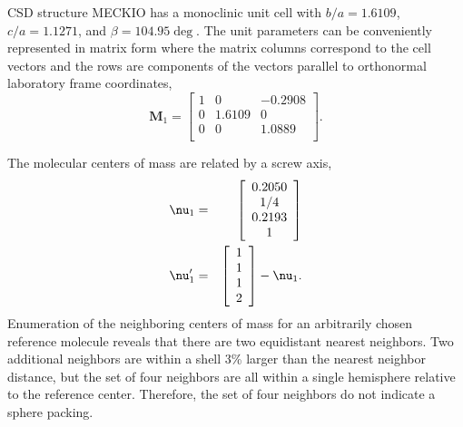 \documentclass[preprint]{iucr}              %
\begin{document}
CSD structure MECKIO has a monoclinic unit cell with $b/a=1.6109$, $c/a=1.1271$, and $\beta=104.95\deg$.  The unit parameters can be conveniently represented in matrix form where the matrix columns correspond to the cell vectors and the rows are components of the vectors parallel to orthonormal laboratory frame coordinates,
\begin{equation}
   \mathbf{M}_1=\left[
     \begin{array}{ccc}
        1& 0& -0.2908\\
        0& 1.6109& 0\\
        0& 0& 1.0889\\
     \end{array}
  \right].
\end{equation}

The molecular centers of mass are related by a screw axis,
\begin{eqnarray}
   \mbox{\boldmath$\nu$}_{1}&=&\left[
     \begin{array}{c}
        0.2050\\
        1/4\\
        0.2193\\
	1\\
     \end{array}
  \right]\\
   \mbox{\boldmath$\nu$}_{1}^{\prime}&=&\left[
     \begin{array}{c}
        1\\
        1\\
        1\\
	2\\
     \end{array}
  \right]-\mbox{\boldmath$\nu$}_{1}.
\end{eqnarray}
Enumeration of the neighboring centers of mass for an arbitrarily chosen reference molecule reveals that there are two equidistant nearest neighbors.  Two additional neighbors are within a shell 3\% larger than the nearest neighbor distance, but the set of four neighbors are all within a single hemisphere relative to the reference center.  Therefore, the set of four neighbors do not indicate a sphere packing.
\end{document}
